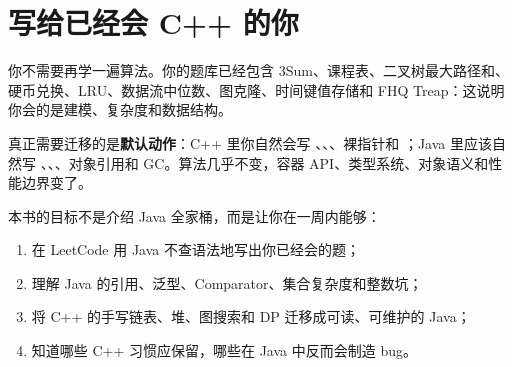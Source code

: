\chapter*{写给已经会 C++ 的你}

你不需要再学一遍算法。你的题库已经包含 3Sum、课程表、二叉树最大路径和、硬币兑换、LRU、数据流中位数、图克隆、时间键值存储和 FHQ Treap：这说明你会的是建模、复杂度和数据结构。

真正需要迁移的是\textbf{默认动作}：C++ 里你自然会写 、、、裸指针和 ；Java 里应该自然写 、、、对象引用和 GC。算法几乎不变，容器 API、类型系统、对象语义和性能边界变了。

本书的目标不是介绍 Java 全家桶，而是让你在一周内能够：
\begin{enumerate}
  \item 在 LeetCode 用 Java 不查语法地写出你已经会的题；
  \item 理解 Java 的引用、泛型、Comparator、集合复杂度和整数坑；
  \item 将 C++ 的手写链表、堆、图搜索和 DP 迁移成可读、可维护的 Java；
  \item 知道哪些 C++ 习惯应保留，哪些在 Java 中反而会制造 bug。
\end{enumerate}
